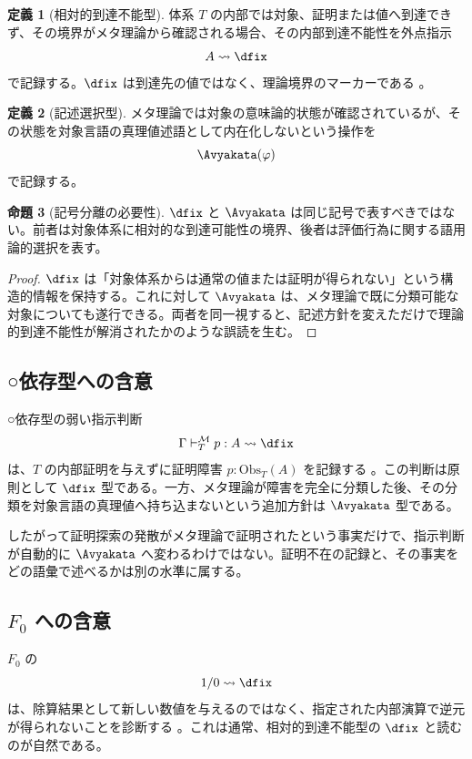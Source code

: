 \documentclass[11pt,a4paper]{article}
\theoremstyle{definition}
\newtheorem{definition}{定義}[section]
\theoremstyle{definition}
\newtheorem{proposition}[definition]{命題}
\newcommand{\Meta}{\mathcal{M}}
\newcommand{\Obs}{\mathrm{Obs}}
\begin{document}
\begin{definition}[相対的到達不能型]
体系 $T$ の内部では対象、証明または値へ到達できず、その境界がメタ理論から確認される場合、その内部到達不能性を外点指示
\[
 A\rightsquigarrow\dfix
\]
で記録する。$\dfix$ は到達先の値ではなく、理論境界のマーカーである \cite{ChibaQRB2026,ChibaEPMDTT2026}。
\end{definition}

\begin{definition}[記述選択型]
メタ理論では対象の意味論的状態が確認されているが、その状態を対象言語の真理値述語として内在化しないという操作を
\[
 \Avyakata(\varphi)
\]
で記録する。
\end{definition}

\begin{proposition}[記号分離の必要性]
$\dfix$ と $\Avyakata$ は同じ記号で表すべきではない。前者は対象体系に相対的な到達可能性の境界、後者は評価行為に関する語用論的選択を表す。
\end{proposition}

\begin{proof}
$\dfix$ は「対象体系からは通常の値または証明が得られない」という構造的情報を保持する。これに対して $\Avyakata$ は、メタ理論で既に分類可能な対象についても遂行できる。両者を同一視すると、記述方針を変えただけで理論的到達不能性が解消されたかのような誤読を生む。
\end{proof}

\subsection{○依存型への含意}

○依存型の弱い指示判断
\[
 \Gamma\vdash_T^{\Meta}p:A\rightsquigarrow\dfix
\]
は、$T$ の内部証明を与えずに証明障害 $p:\Obs_T(A)$ を記録する \cite{ChibaEPMDTT2026}。この判断は原則として $\dfix$ 型である。一方、メタ理論が障害を完全に分類した後、その分類を対象言語の真理値へ持ち込まないという追加方針は $\Avyakata$ 型である。

したがって証明探索の発散がメタ理論で証明されたという事実だけで、指示判断が自動的に $\Avyakata$ へ変わるわけではない。証明不在の記録と、その事実をどの語彙で述べるかは別の水準に属する。

\subsection{\texorpdfstring{$F_0$}{F0} への含意}

$F_0$ の
\[
 1/0\leadsto\dfix
\]
は、除算結果として新しい数値を与えるのではなく、指定された内部演算で逆元が得られないことを診断する \cite{ChibaF02026}。これは通常、相対的到達不能型の $\dfix$ と読むのが自然である。
\end{document}
